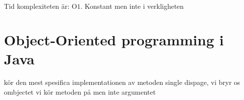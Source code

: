 \begin{multicols}{2}
Tid komplexiteten är: O\(1\). Konstant men inte i verkligheten



\section{Object-Oriented programming i Java}




kör den mest spesifica implementationen av metoden
single dispage, vi bryr os ombjectet vi kör metoden på men inte argumentet
\end{multicols}
\raggedcolumns